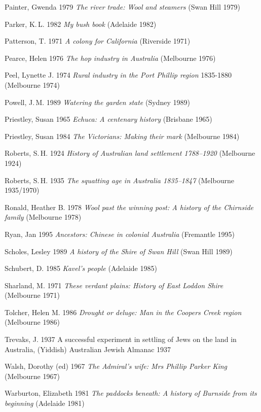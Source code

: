 Painter, Gwenda 1979 \textsl{The river trade: Wool and steamers} (Swan
Hill 1979)

Parker, K.\,L.  1982 \textsl{My bush book} (Adelaide 1982)

Patterson, T. 1971 \textsl{A colony for California} (Riverside 1971)

Pearce, Helen 1976 \textsl{The hop industry in Australia} (Melbourne
1976)

Peel, Lynette J. 1974 \textsl{Rural industry in the Port Phillip
region} 1835-1880 (Melbourne 1974)

Powell, J.\,M. 1989 \textsl{Watering the garden state} (Sydney 1989)

Priestley, Susan 1965 \textsl{Echuca: A centenary history} (Brisbane
1965)

Priestley, Susan 1984 \textsl{The Victorians: Making their mark}
(Melbourne 1984)

Roberts, S.\,H.  1924 \textsl{History of Australian land settlement
1788--1920} (Melbourne 1924)

Roberts, S.\,H. 1935 \textsl{The squatting age in Australia
1835--1847} (Melbourne 1935/1970)

Ronald, Heather B.  1978 \textsl{Wool past the winning post: A history
of the Chirnside family} (Melbourne 1978)

Ryan, Jan 1995 \textsl{Ancestors: Chinese in colonial Australia}
(Fremantle 1995)

Scholes, Lesley 1989 \textsl{A history of the Shire of Swan Hill}
(Swan Hill 1989)

Schubert, D.  1985 \textsl{Kavel's people} (Adelaide 1985)

Sharland, M.  1971 \textsl{These verdant plains: History of East
Loddon Shire} (Melbourne 1971)

Tolcher, Helen M. 1986 \textsl{Drought or deluge: Man in the Coopers
Creek region} (Melbourne 1986)

Trevaks, J. 1937 A successful experiment in settling of Jews on the
land in Australia, (Yiddish) Australian Jewish Almanac 1937

Walsh, Dorothy (ed) 1967 \textsl{The Admiral's wife: Mrs Phillip
Parker King} (Melbourne 1967)

Warburton, Elizabeth 1981 \textsl{The paddocks beneath: A history of
Burnside from its beginning} (Adelaide 1981)

